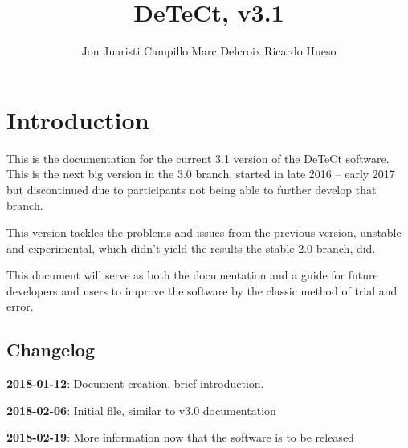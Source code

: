 \documentclass[a4paper,11pt]{memoir}
\title{DeTeCt, v3.1}
\author{Jon Juaristi Campillo,Marc Delcroix,Ricardo Hueso}
\begin{document}
\frontmatter

\smarttitle



\setcounter{tocdepth}{2}
\tableofcontents

\newpage

\listoftables

\newpage

\listoffigures

\mainmatter

\chapter{Introduction}

This is the documentation for the current 3.1 version of the DeTeCt software. This is the next big version in the 3.0 branch, started in late 2016 -- early 2017 but discontinued due to participants not being able to further develop that branch.

This version tackles the problems and issues from the previous version, unstable and experimental, which didn’t yield the results the stable 2.0 branch, did.

This document will serve as both the documentation and a guide for future developers and users to improve the software by the classic method of trial and error.

\section{Changelog}

\textbf{2018-01-12}: Document creation, brief introduction.

\textbf{2018-02-06}: Initial file, similar to v3.0 documentation

\textbf{2018-02-19}: More information now that the software is to be released
\end{document}
